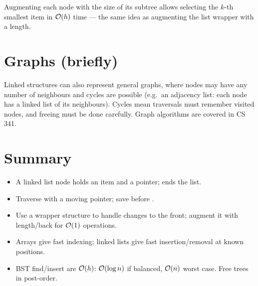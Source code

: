 \begin{aside}
Augmenting each node with the size of its subtree allows selecting the $k$-th smallest item in
$\mathcal{O}(h)$ time --- the same idea as augmenting the list wrapper with a length.
\end{aside}

\section{Graphs (briefly)}

Linked structures can also represent general graphs, where nodes may have any number of
neighbours and cycles are possible (e.g.\ an adjacency list: each node has a linked list of its
neighbours). Cycles mean traversals must remember visited nodes, and freeing must be done
carefully. Graph algorithms are covered in CS 341.

\section{Summary}
\begin{itemize}
  \item A linked list node holds an item and a  pointer;  ends the list.
  \item Traverse with a moving pointer; save  before .
  \item Use a wrapper structure to handle changes to the front; augment it with length/back for
    $\mathcal{O}(1)$ operations.
  \item Arrays give fast indexing; linked lists give fast insertion/removal at known positions.
  \item BST find/insert are $\mathcal{O}(h)$: $\mathcal{O}(\log n)$ if balanced, $\mathcal{O}(n)$ worst case. Free
    trees in post-order.
\end{itemize}
